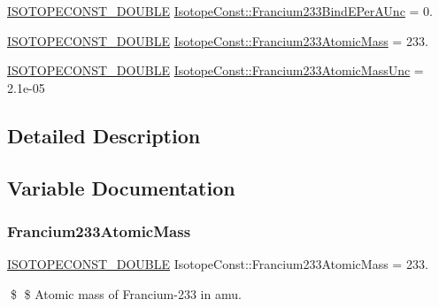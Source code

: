 \begin{DoxyCompactItemize}
\mbox{\hyperlink{group___isotope_const-_macros_ga8f45a7272ce02c0b4c65c44636ed719a}{I\+S\+O\+T\+O\+P\+E\+C\+O\+N\+S\+T\+\_\+\+D\+O\+U\+B\+LE}} \mbox{\hyperlink{group___isotope_const-_francium-_fr233_gaf890f6cea6639c0e57b74504a1af831a}{Isotope\+Const\+::\+Francium233\+Bind\+E\+Per\+A\+Unc}} = 0.
\item 
\mbox{\hyperlink{group___isotope_const-_macros_ga8f45a7272ce02c0b4c65c44636ed719a}{I\+S\+O\+T\+O\+P\+E\+C\+O\+N\+S\+T\+\_\+\+D\+O\+U\+B\+LE}} \mbox{\hyperlink{group___isotope_const-_francium-_fr233_ga2686921c923e1e4973dd60e6738911c7}{Isotope\+Const\+::\+Francium233\+Atomic\+Mass}} = 233.
\item 
\mbox{\hyperlink{group___isotope_const-_macros_ga8f45a7272ce02c0b4c65c44636ed719a}{I\+S\+O\+T\+O\+P\+E\+C\+O\+N\+S\+T\+\_\+\+D\+O\+U\+B\+LE}} \mbox{\hyperlink{group___isotope_const-_francium-_fr233_gaaff297d9d6bbff91a6e783bc9e0fb231}{Isotope\+Const\+::\+Francium233\+Atomic\+Mass\+Unc}} = 2.\+1e-\/05
\end{DoxyCompactItemize}


\subsection{Detailed Description}


\subsection{Variable Documentation}
\mbox{\label{group___isotope_const-_francium-_fr233_ga2686921c923e1e4973dd60e6738911c7}} 
\subsubsection{\texorpdfstring{Francium233\+Atomic\+Mass}{Francium233AtomicMass}}
{\footnotesize\ttfamily \mbox{\hyperlink{group___isotope_const-_macros_ga8f45a7272ce02c0b4c65c44636ed719a}{I\+S\+O\+T\+O\+P\+E\+C\+O\+N\+S\+T\+\_\+\+D\+O\+U\+B\+LE}} Isotope\+Const\+::\+Francium233\+Atomic\+Mass = 233.}

\$ \$ Atomic mass of Francium-\/233 in amu. \mbox{\label{group___isotope_const-_francium-_fr233_gaaff297d9d6bbff91a6e783bc9e0fb231}} 
